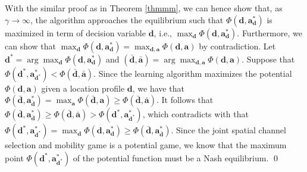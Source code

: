 With the similar proof as in Theorem \ref{thmmm}, we can hence show that, as $\gamma\rightarrow\infty$, the algorithm approaches
the equilibrium such that $\Phi(\boldsymbol{d},\boldsymbol{a}_{\boldsymbol{d}}^{*})$ is maximized in term of decision variable $\boldsymbol{d}$, i.e., $\max_{\boldsymbol{d}}\Phi(\boldsymbol{d},\boldsymbol{a}_{\boldsymbol{d}}^{*})$. Furthermore, we can show that $\max_{\boldsymbol{d}}\Phi(\boldsymbol{d},\boldsymbol{a}_{\boldsymbol{d}}^{*})=\max_{\boldsymbol{d},\boldsymbol{a}}\Phi(\boldsymbol{d},\boldsymbol{a})$ by contradiction. Let $\boldsymbol{d}^{*}=\arg\max_{\boldsymbol{d}}\Phi(\boldsymbol{d},\boldsymbol{a}_{\boldsymbol{d}}^{*})$ and $(\bar{\boldsymbol{d}},\bar{\boldsymbol{a}})=\arg\max_{\boldsymbol{d},\boldsymbol{a}}\Phi(\boldsymbol{d},\boldsymbol{a})$. Suppose that $\Phi(\boldsymbol{d}^{*},\boldsymbol{a}_{\boldsymbol{d}^{*}}^{*})<\Phi(\bar{\boldsymbol{d}},\bar{\boldsymbol{a}})$.
Since the learning algorithm maximizes the potential $\Phi(\boldsymbol{d},\boldsymbol{a})$
given a location profile $\boldsymbol{d}$, we have that $\Phi(\bar{\boldsymbol{d}},\boldsymbol{a}_{\bar{\boldsymbol{d}}}^{*})=\max_{\boldsymbol{a}}\Phi(\bar{\boldsymbol{d}},\boldsymbol{a})\geq\Phi(\bar{\boldsymbol{d}},\bar{\boldsymbol{a}})$.
It follows that $\Phi(\bar{\boldsymbol{d}},\boldsymbol{a}_{\bar{\boldsymbol{d}}}^{*})\geq\Phi(\bar{\boldsymbol{d}},\bar{\boldsymbol{a}})>\Phi(\boldsymbol{d}^{*},\boldsymbol{a}_{\boldsymbol{d}^{*}}^{*})$,
which contradicts with that $\Phi(\boldsymbol{d}^{*},\boldsymbol{a}_{\boldsymbol{d}^{*}}^{*})=\max_{\boldsymbol{d}}\Phi(\boldsymbol{d},\boldsymbol{a}_{\boldsymbol{d}}^{*})\geq\Phi(\bar{\boldsymbol{d}},\boldsymbol{a}_{\bar{\boldsymbol{d}}}^{*})$.
Since the joint spatial channel selection and mobility game is a
potential game, we know that the maximum point $\Phi(\boldsymbol{d}^{*},\boldsymbol{a}_{\boldsymbol{d}^{*}}^{*})$ of the potential function must be a Nash equilibrium. \qed


